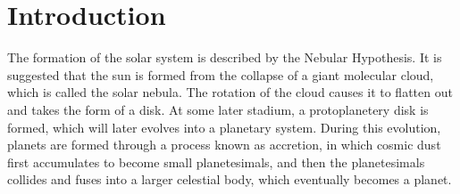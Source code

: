 \section{Introduction}
The formation of the solar system is described by the Nebular Hypothesis. It is suggested that the sun is formed from the collapse of a giant molecular cloud, which is called the solar nebula. The rotation of the cloud causes it to flatten out and takes the form of a disk. At some later stadium, a protoplanetery disk is formed, which will later evolves into a planetary system. During this evolution, planets are formed through a process known as accretion, in which cosmic dust first accumulates to become small planetesimals, and then the planetesimals collides and fuses into a larger celestial body, which eventually becomes a planet.\\

